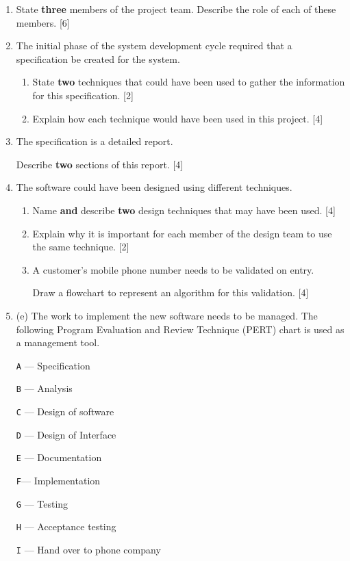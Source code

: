 \begin{enumerate}
\item State \textbf{three} members of the project team. Describe the role
of each of these members. \hfill{}{[}6{]}
\item The initial phase of the system development cycle required that a
specification be created for the system. 
\begin{enumerate}
\item State \textbf{two} techniques that could have been used to gather
the information for this specification. \hfill{} {[}2{]}
\item Explain how each technique would have been used in this project. \hfill{}
{[}4{]}
\end{enumerate}
\item The specification is a detailed report.

Describe \textbf{two} sections of this report. \hfill{}{[}4{]}
\item The software could have been designed using different techniques. 
\begin{enumerate}
\item Name \textbf{and} describe \textbf{two} design techniques that may
have been used. \hfill{} {[}4{]}
\item Explain why it is important for each member of the design team to
use the same technique. \hfill{} {[}2{]}
\item A customer's mobile phone number needs to be validated on entry. 

Draw a flowchart to represent an algorithm for this validation. \hfill{}
{[}4{]}
\end{enumerate}
\item (e) The work to implement the new software needs to be managed. The
following Program Evaluation and Review Technique (PERT) chart is
used as a management tool. 

\texttt{A} --- Specification 

\texttt{B} --- Analysis 

\texttt{C} --- Design of software 

\texttt{D} --- Design of Interface 

\texttt{E} --- Documentation 

\texttt{F}--- Implementation 

\texttt{G} --- Testing 

\texttt{H} --- Acceptance testing

\texttt{I} --- Hand over to phone company 


\end{enumerate}
